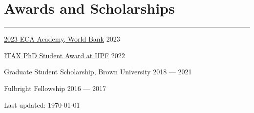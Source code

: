 \documentclass[a4paper,11pt]{article}
\newcommand{\sectitle}[1]{
    \vspace{1.5ex}
    \section{#1}
    \vspace{-2.5ex}
    \noindent\rule{\textwidth}{0.5pt}
    \vspace{-4ex}
}
\begin{document}
\sectitle{Awards and Scholarships}

\href{https://www.worldbank.org/en/region/eca/brief/ecace-academy}{2023 ECA Academy, World Bank} \hfill 2023

\href{https://www.iipf.org/itaxaward.html}{ITAX PhD Student Award at IIPF} \hfill 2022

Graduate Student Scholarship, Brown University \hfill 2018 --- 2021

Fulbright Fellowship \hfill 2016 --- 2017







\vfill
\begin{center}
    Last updated: \monthyeardate\today
\end{center}
\end{document}
